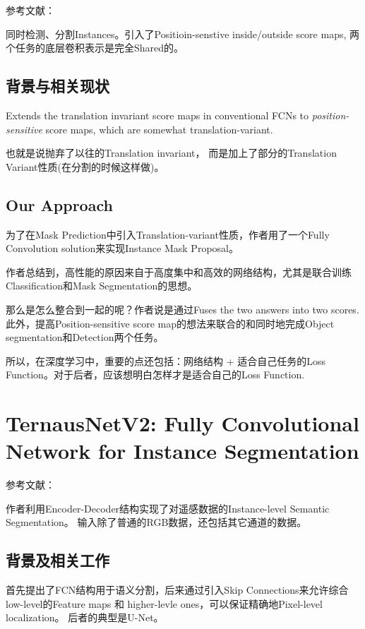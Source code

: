 参考文献：\cite{li2016fully}

同时检测、分割Instances。引入了Positioin-senstive inside/outside score maps, 两个任务的底层卷积表示是完全Shared的。

\subsection{背景与相关现状}

Extends the translation invariant score maps in conventional FCNs to \textit{position-sensitive} score maps, which are somewhat translation-variant.

也就是说抛弃了以往的Translation invariant， 而是加上了部分的Translation Variant性质(在分割的时候这样做)。

\subsection{Our Approach}

为了在Mask Prediction中引入Translation-variant性质，作者用了一个Fully Convolution solution来实现Instance Mask Proposal。

作者总结到，高性能的原因来自于高度集中和高效的网络结构，尤其是联合训练Classification和Mask Segmentation的思想。

那么是怎么整合到一起的呢？作者说是通过Fuses the two answers into two scores. 此外，提高Position-sensitive score map的想法来联合的和同时地完成Object segmentation和Detection两个任务。

所以，在深度学习中，重要的点还包括：网络结构 + 适合自己任务的Loss Function。对于后者，应该想明白怎样才是适合自己的Loss Function.

\section{TernausNetV2: Fully Convolutional Network for Instance Segmentation}

参考文献：\cite{iglovikov2018ternausnetv2}

作者利用Encoder-Decoder结构实现了对遥感数据的Instance-level Semantic Segmentation。 输入除了普通的RGB数据，还包括其它通道的数据。

\subsection{背景及相关工作}

首先提出了FCN结构用于语义分割，后来通过引入Skip Connections来允许综合low-level的Feature maps 和 higher-levle ones，可以保证精确地Pixel-level localization。 后者的典型是U-Net。


